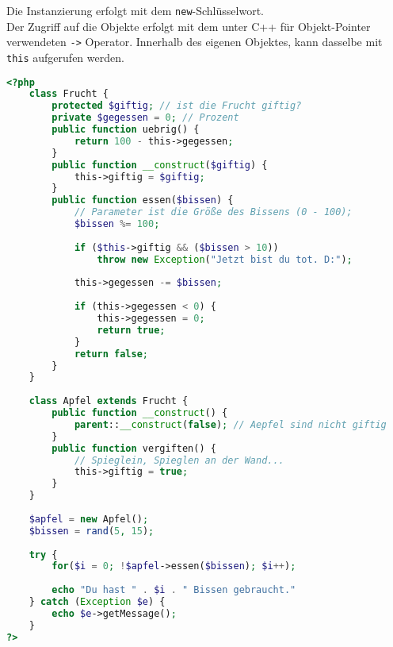 Die Instanzierung erfolgt mit dem \texttt{new}-Schlüsselwort.\\
Der Zugriff auf die Objekte erfolgt mit dem unter C++ für Objekt-Pointer verwendeten \texttt{->} Operator. Innerhalb des eigenen Objektes, kann dasselbe mit \texttt{this} aufgerufen werden.
\begin{lstlisting}[style=custom, language=PHP,  caption={Beispiel: OOP in PHP},label={lst:content_php_php}]
<?php 
	class Frucht {
		protected $giftig; // ist die Frucht giftig?
		private $gegessen = 0; // Prozent
		public function uebrig() {
			return 100 - this->gegessen;
		}
		public function __construct($giftig) {
			this->giftig = $giftig;
		}
		public function essen($bissen) {
			// Parameter ist die Größe des Bissens (0 - 100);
			$bissen %= 100; 
			
			if ($this->giftig && ($bissen > 10))
				throw new Exception("Jetzt bist du tot. D:");
				
			this->gegessen -= $bissen;
			
			if (this->gegessen < 0) {
				this->gegessen = 0;
				return true;
			}
			return false;
		}
	}
	
	class Apfel extends Frucht {
		public function __construct() {
			parent::__construct(false); // Aepfel sind nicht giftig
		}
		public function vergiften() {
			// Spieglein, Spieglen an der Wand...
			this->giftig = true;
		}
	}
	
	$apfel = new Apfel();
	$bissen = rand(5, 15);
	
	try {
		for($i = 0; !$apfel->essen($bissen); $i++);
		
		echo "Du hast " . $i . " Bissen gebraucht."
	} catch (Exception $e) {
		echo $e->getMessage();
	}
?>
\end{lstlisting}
